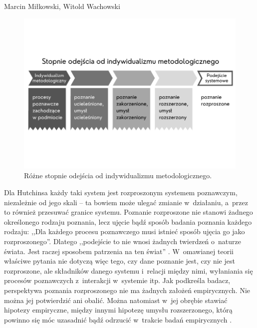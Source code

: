 \begin{artplenv2auth}{Marcin Miłkowski, Witold Wachowski}
\begin{figure}
\begin{center}
 \includegraphics[width=1\textwidth]{ART_milkowski/ilustracja2pu.pdf}
\end{center}
 \caption{Różne stopnie odejścia od indywidualizmu metodologicznego.}\label{fig2milk}
\end{figure}



Dla Hutchinsa każdy taki system jest rozproszonym systemem poznawczym, niezależnie od jego skali -- ta bowiem może ulegać zmianie w~działaniu, a~przez to również przesuwać granice systemu. Poznanie rozproszone nie stanowi żadnego określonego rodzaju poznania, lecz ujęcie bądź sposób badania poznania każdego rodzaju: ,,Dla każdego procesu poznawczego musi istnieć sposób ujęcia go jako rozproszonego''. Dlatego ,,podejście to nie wnosi żadnych twierdzeń o~naturze świata. Jest raczej sposobem patrzenia na ten świat''
\parencite[][s.~36]{hutchins_cultural_2014}. %
 W~omawianej teorii właściwe pytania nie dotyczą więc tego, czy dane poznanie jest, czy nie jest rozproszone, ale składników danego systemu i~relacji między nimi, wyłaniania się procesów poznawczych z~interakcji w~systemie itp. Jak podkreśla badacz, perspektywa poznania rozproszonego nie ma żadnych założeń empirycznych. Nie można jej potwierdzić ani obalić. Można natomiast w~jej obrębie stawiać hipotezy empiryczne, między innymi hipotezę umysłu rozszerzonego, którą powinno się móc uzasadnić bądź odrzucić w~trakcie badań empirycznych 
\parencite[][s.~36–37]{hutchins_cultural_2014}.%



\end{artplenv2auth}
